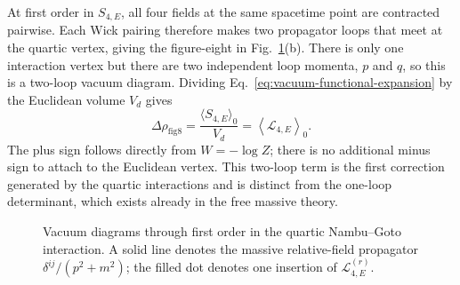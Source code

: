 At first order in $S_{4,E}$, all four fields at the same spacetime point are
contracted pairwise.  Each Wick pairing therefore makes two propagator loops
that meet at the quartic vertex, giving the figure-eight in
Fig.~\ref{fig:vacuum-diagrams}(b).  There is only one interaction vertex but
there are two independent loop momenta, $p$ and $q$, so this is a two-loop
vacuum diagram.  Dividing Eq.~\eqref{eq:vacuum-functional-expansion} by the
Euclidean volume $V_d$ gives
\begin{equation}
  \Delta\rho_{\mathrm{fig8}}
  = \frac{\langle S_{4,E}\rangle_0}{V_d}
  = \left\langle \mathcal L_{4,E}\right\rangle_0 .
  \label{eq:vacuum-energy-first-interaction}
\end{equation}
The plus sign follows directly from $W=-\log Z$; there is no additional minus
sign to attach to the Euclidean vertex.  This two-loop term is the first
correction generated by the quartic interactions and is distinct from the
one-loop determinant, which exists already in the free massive theory.

\begin{figure}[h!]
  \centering
  \begin{minipage}{0.42\linewidth}
    \centering
  \end{minipage}
  \hfill
  \begin{minipage}{0.48\linewidth}
    \centering
  \end{minipage}
  \caption{Vacuum diagrams through first order in the quartic Nambu--Goto
  interaction.  A solid line denotes the massive relative-field propagator
  $\delta^{ij}/(p^2+m^2)$; the filled dot denotes one insertion of
  $\mathcal L_{4,E}^{(r)}$.}
  \label{fig:vacuum-diagrams}
\end{figure}

